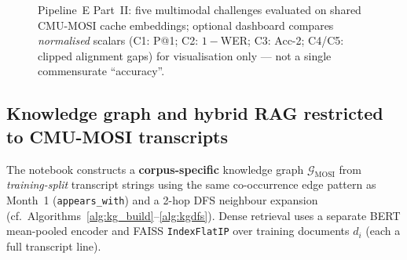 \documentclass[12pt,a4paper]{article}
\theoremstyle{definition}
\theoremstyle{plain}
\theoremstyle{remark}
\newcommand{\KG}{\mathcal{G}}
\begin{document}
\begin{figure}[H]
\centering
{}
\caption{Pipeline~E Part~II: five multimodal challenges evaluated on shared CMU-MOSI cache embeddings; optional dashboard compares \emph{normalised} scalars (C1: P@1; C2: $1-$WER; C3: Acc-2; C4/C5: clipped alignment gaps) for visualisation only --- not a single commensurate ``accuracy''.}
\label{fig:pipeline_e_challenges_flow}
\end{figure}

\subsection{Knowledge graph and hybrid RAG restricted to CMU-MOSI transcripts}
\label{sec:pipelineE_mosi_rag}

The notebook constructs a \textbf{corpus-specific} knowledge graph $\KG_{\text{MOSI}}$ from \emph{training-split} transcript strings using the same co-occurrence edge pattern as Month~1 (\texttt{appears\_with}) and a 2-hop DFS neighbour expansion (cf.\ Algorithms~\ref{alg:kg_build}--\ref{alg:kgdfs}). Dense retrieval uses a separate BERT mean-pooled encoder and FAISS \texttt{IndexFlatIP} over training documents $d_i$ (each a full transcript line).
\end{document}

